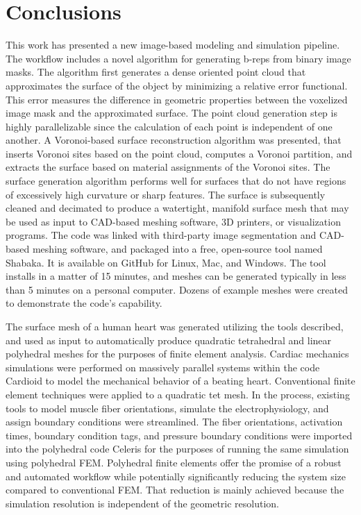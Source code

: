\chapter{Conclusions}
\label{chap:7}
%

This work has presented a new image-based modeling and simulation pipeline. The workflow includes a novel algorithm for generating b-reps from binary image masks. The algorithm first generates a dense oriented point cloud that approximates the surface of the object by minimizing a relative error functional. This error measures the difference in geometric properties between the voxelized image mask and the approximated surface. The point cloud generation step is highly parallelizable since the calculation of each point is independent of one another. A Voronoi-based surface reconstruction algorithm was presented, that inserts Voronoi sites based on the point cloud, computes a Voronoi partition, and extracts the surface based on material assignments of the Voronoi sites. The surface generation algorithm performs well for surfaces that do not have regions of excessively high curvature or sharp features. The surface is subsequently cleaned and decimated to produce a watertight, manifold surface mesh that may be used as input to CAD-based meshing software, 3D printers, or visualization programs. The code was linked with third-party image segmentation and CAD-based meshing software, and packaged into a free, open-source tool named Shabaka. It is available on GitHub for Linux, Mac, and Windows. The tool installs in a matter of 15 minutes, and meshes can be generated typically in less than 5 minutes on a personal computer. Dozens of example meshes were created to demonstrate the code's capability.

The surface mesh of a human heart was generated utilizing the tools described, and used as input to automatically produce quadratic tetrahedral and linear polyhedral meshes for the purposes of finite element analysis. Cardiac mechanics simulations were performed on massively parallel systems within the code Cardioid to model the mechanical behavior of a beating heart. Conventional finite element techniques were applied to a quadratic tet mesh. In the process, existing tools to model muscle fiber orientations, simulate the electrophysiology, and assign boundary conditions were streamlined. The fiber orientations, activation times, boundary condition tags, and pressure boundary conditions were imported into the polyhedral code Celeris for the purposes of running the same simulation using polyhedral FEM. Polyhedral finite elements offer the promise of a robust and automated workflow while potentially significantly reducing the system size compared to conventional FEM. That reduction is mainly achieved because the simulation resolution is independent of the geometric resolution. 


